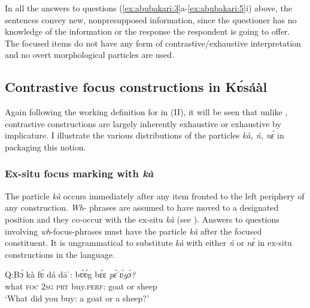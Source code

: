 \documentclass[output=paper
,newtxmath
,modfonts
,nonflat]{langsci/langscibook}
\begin{document}
In all the answers to questions (\ref{ex:abubakari:3}a-\ref{ex:abubakari:5}i) above, the sentences convey new, nonpresupposed information, since the questioner has no knowledge of the information or the response the respondent is going to offer. The focused items do not have any form of contrastive/exhaustive interpretation and no overt morphological  particles are used. 

\subsection{Contrastive focus constructions in Kʋ́sáàl}\label{sec:abubakari:2.2}

Again following the working definition for  in (II), it will be seen that unlike , contrastive  constructions are largely inherently exhaustive or exhaustive by implicature. I illustrate the various distributions of the particles \textit{kà, ń, nɛ́} in packaging this notion.

\subsubsection{Ex-situ focus marking with \textit{kà}}

The particle \textit{kà} occurs immediately after any item fronted to the left periphery of any construction. \textit{Wh}{}- phrases are assumed to have moved to a designated  position and they co-occur with the ex-situ  \textit{kà} (see \citealt{aboh2007}). Answers to questions involving \textit{wh}{}-focus-phrases must have the particle \textit{kà} after the focused constituent. It is ungrammatical to substitute \textit{kà} with either \textit{ń} or \textit{nɛ́} in ex-situ  constructions in the language. 

 
\ea\label{ex:abubakari:6}
\ea \label{ex:abubakari:6a} 
Q:\gll Bɔ́  kà  fʋ̀  dá  dāˈ:    bʋ́ʋ́g  bɛ́ɛ  \textit{pɛ́ˈʋ́gɔ́?}\\  
what  \textsc{foc}  2\textsc{sg}  \textsc{prt}  buy.\textsc{perf}:  goat  or 
sheep          \\
\glt ‘What did you buy: a goat or a sheep?’ 
\end{document}
